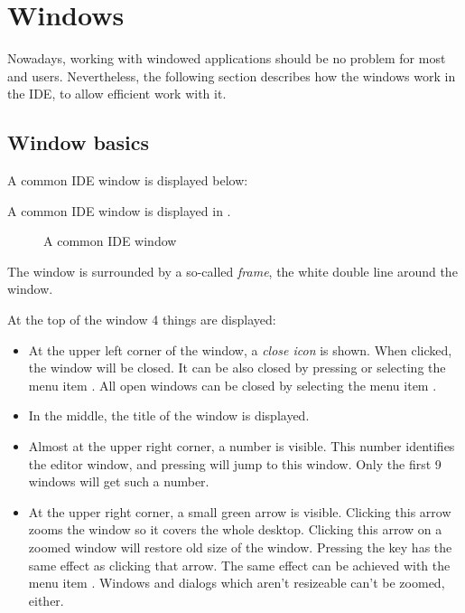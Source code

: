 \section{Windows}
\label{se:windows}
Nowadays, working with windowed applications should be no problem for
most \windows and \linux users. Nevertheless, the following section 
describes how the windows work in the \fpc IDE, to allow efficient 
work with it.
%
%
\subsection{Window basics}
\label{se:windowbasics}
\begin{htmlonly}
A common IDE window is displayed  below:
\end{htmlonly}
\begin{latexonly}
A common IDE window is displayed in .
\begin{figure}
\caption{A common IDE window}
\label{fig:idewin}
\ifpdf
{}
\else
{}
\fi
\end{figure}
\end{latexonly}
The window is surrounded by a so-called \emph{frame}, the white double
line around the window. 

At the top of the window 4 things are displayed:
\begin{itemize}
\item 
At the upper left corner of the window, a \emph{close icon} is shown. 
When clicked, the window will be closed. It can be also closed by
 pressing  or selecting the menu item . 
All open windows can be closed by selecting the menu item 
.
\item In the middle, the title of the window is displayed.
\item Almost at the upper right corner, a number is visible.
This number identifies the editor window, and pressing 
will jump to this window. Only the first 9 windows will get such a number.
\item At the upper right corner, a small green arrow is visible.
Clicking this arrow zooms the window so it covers the whole desktop. 
Clicking this arrow on a zoomed window will restore old size of the 
window. Pressing the key  has the same effect as clicking 
that arrow. The same effect can be achieved with the menu item 
. 
Windows and dialogs which aren't resizeable can't be zoomed, either.
\end{itemize}

